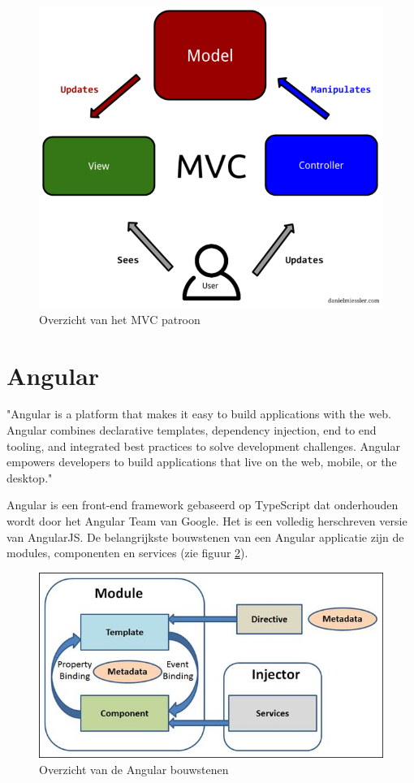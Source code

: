 \begin{figure}[H]
	\centering
	\includegraphics[width=0.6\linewidth]{MVC}
	\caption{Overzicht van het MVC patroon \autocite{DanielMissler2017}}
	\label{fig:Mvc}
\end{figure}

\section{Angular}
"Angular is a platform that makes it easy to build applications with the web. Angular combines declarative templates, dependency injection, end to end tooling, and integrated best practices to solve development challenges. Angular empowers developers to build applications that live on the web, mobile, or the desktop." \autocite{Angular2019} 

Angular is een front-end framework gebaseerd op TypeScript dat onderhouden wordt door het Angular Team van Google. Het is een volledig herschreven versie van AngularJS.
De belangrijkste bouwstenen van een Angular applicatie zijn de modules, componenten en services (zie figuur \ref{fig:Angular-Module-Component}).

\begin{figure}[H]
	\centering
	\includegraphics[width=0.6\linewidth]{Angular-Module-Component}
	\caption{Overzicht van de Angular bouwstenen \autocite{Trivedi2016}}
	\label{fig:Angular-Module-Component}
\end{figure}


